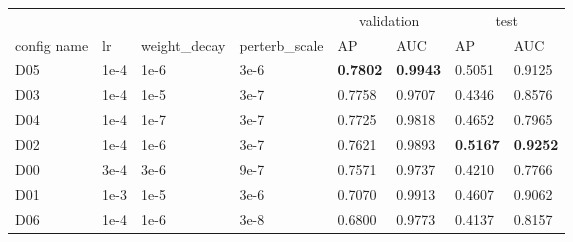 \documentclass[10pt,twocolumn,letterpaper]{article}
\begin{document}
\begin{table*}[t]
\centering
\begin{tabular}{llllllll}
\toprule
            \multicolumn{4}{l}{} & \multicolumn{2}{c}{validation} & \multicolumn{2}{c}{test} \\
config name &   lr & weight\_decay & perterb\_scale & AP & AUC & AP & AUC \\
\midrule
        \textcolor[HTML]{623682}{D05} & 1e-4 &   1e-6 &  3e-6 & \textbf{0.7802} & \textbf{0.9943} &          0.5051 &          0.9125 \\
        \textcolor[HTML]{df8020}{D03} & 1e-4 &   1e-5 &  3e-7 &          0.7758 &          0.9707 &          0.4346 &          0.8576 \\
        \textcolor[HTML]{87b787}{D04} & 1e-4 &   1e-7 &  3e-7 &          0.7725 &          0.9818 &          0.4652 &          0.7965 \\
        \textcolor[HTML]{207fdf}{D02} & 1e-4 &   1e-6 &  3e-7 &          0.7621 &          0.9893 & \textbf{0.5167} & \textbf{0.9252} \\
        \textcolor[HTML]{20df20}{D00} & 3e-4 &   3e-6 &  9e-7 &          0.7571 &          0.9737 &          0.4210 &          0.7766 \\
        \textcolor[HTML]{df20df}{D01} & 1e-3 &   1e-5 &  3e-6 &          0.7070 &          0.9913 &          0.4607 &          0.9062 \\
        \textcolor[HTML]{b00403}{D06} & 1e-4 &   1e-6 &  3e-8 &          0.6800 &          0.9773 &          0.4137 &          0.8157 \\
        

\end{tabular}
\end{table*}
\end{document}
